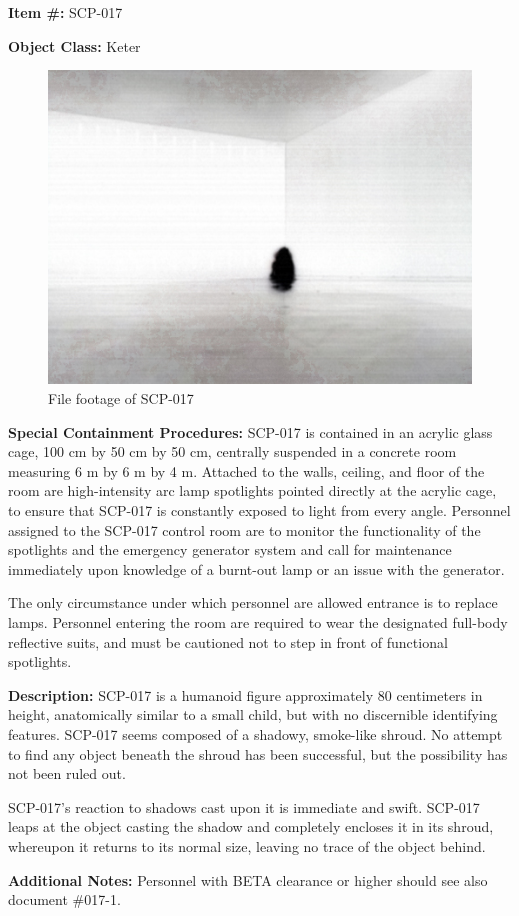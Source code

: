 
\textbf{Item \#:} SCP-017

\textbf{Object Class:} Keter

\begin{figure}[h]
\begin{center}
\includegraphics[scale=0.5]{scp/017.jpg}
\linebreak File footage of SCP-017
\end{center}
\end{figure}

\textbf{Special Containment Procedures:} SCP-017 is contained in an acrylic glass cage, 100 cm by 50 cm by 50 cm, centrally suspended in a concrete room measuring 6 m by 6 m by 4 m. Attached to the walls, ceiling, and floor of the room are high-intensity arc lamp spotlights pointed directly at the acrylic cage, to ensure that SCP-017 is constantly exposed to light from every angle. Personnel assigned to the SCP-017 control room are to monitor the functionality of the spotlights and the emergency generator system and call for maintenance immediately upon knowledge of a burnt-out lamp or an issue with the generator.

The only circumstance under which personnel are allowed entrance is to replace lamps. Personnel entering the room are required to wear the designated full-body reflective suits, and must be cautioned not to step in front of functional spotlights.

\textbf{Description:} SCP-017 is a humanoid figure approximately 80 centimeters in height, anatomically similar to a small child, but with no discernible identifying features. SCP-017 seems composed of a shadowy, smoke-like shroud. No attempt to find any object beneath the shroud has been successful, but the possibility has not been ruled out.

SCP-017's reaction to shadows cast upon it is immediate and swift. SCP-017 leaps at the object casting the shadow and completely encloses it in its shroud, whereupon it returns to its normal size, leaving no trace of the object behind.

\textbf{Additional Notes:} Personnel with BETA clearance or higher should see also document \#017-1.